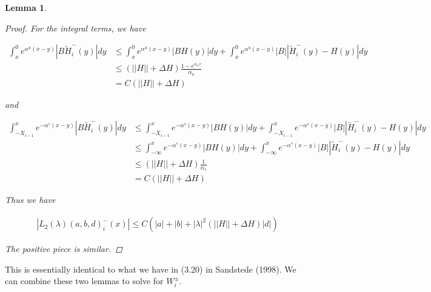 \documentclass[12pt]{article}
\newtheorem{lemma}{Lemma}
\begin{document}
\begin{lemma}
\begin{proof}
For the integral terms, we have

\begin{align*}
\int_x^0 e^{\alpha^u (x - y)}|B\tilde{H}_i^-(y)| dy &\leq \int_x^0 e^{\alpha^u (x - y)}|BH(y)| dy + \int_x^0 e^{\alpha^u (x - y)}|B||\tilde{H}_i^-(y) - H(y)| dy \\
&\leq (||H|| + \Delta H)\frac{1 - e^{\alpha_u x}}{\alpha_u} \\
&= C( ||H|| + \Delta H )
\end{align*}

and

\begin{align*}
\int_{-X_{i-1}}^x e^{-\alpha^s (x - y)}|B\tilde{H}_i^-(y)| dy &\leq \int_{-X_{i-1}}^x e^{-\alpha^s (x - y)}|BH(y)| dy + \int_{-X_{i-1}}^x e^{-\alpha^s (x - y)}|B||\tilde{H}_i^-(y) - H(y)| dy \\
&\leq \int_{-\infty}^x e^{-\alpha^s (x - y)}|BH(y)| dy + \int_{-\infty}^x e^{-\alpha^s (x - y)}|B||\tilde{H}_i^-(y) - H(y)| dy \\
&\leq (||H|| + \Delta H)\frac{1}{\alpha_s} \\
&= C( ||H|| + \Delta H )
\end{align*}

Thus we have

\begin{align*}
| L_2(\lambda)(a, b, d)_i^-(x)| \leq C(|a| + |b| + |\lambda|^2 ( ||H|| + \Delta H ) |d|) 
\end{align*}

The positive piece is similar.

\end{proof}

\end{lemma}

This is essentially identical to what we have in (3.20) in Sandstede (1998). We can combine these two lemmas to solve for $W_i^\pm$.
\end{document}
